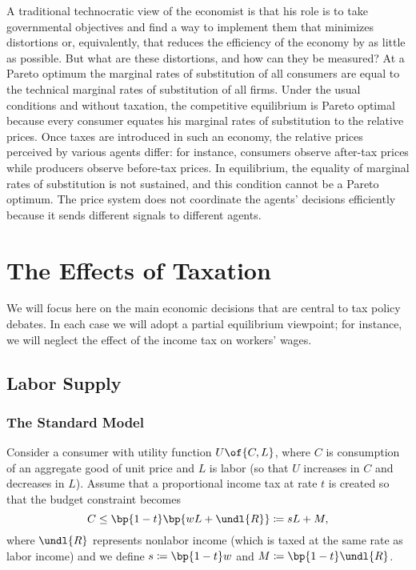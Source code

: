 \documentclass[12pt]{report}
\theoremstyle{definition}
\begin{document}
A traditional technocratic view of the economist is that his role is to take governmental objectives and find a way to implement them that minimizes distortions or, equivalently, that reduces the efficiency of the economy by as little as possible. But what are these distortions, and how can they be measured? At a Pareto optimum the marginal rates of substitution of all consumers are equal to the technical marginal rates of substitution of all firms. Under the usual conditions and without taxation, the competitive equilibrium is Pareto optimal because every consumer equates his marginal rates of substitution to the relative prices. Once taxes are introduced in such an economy, the relative prices perceived by various agents differ: for instance, consumers observe after-tax prices while producers observe before-tax prices. In equilibrium, the equality of marginal rates of substitution is not sustained, and this condition cannot be a Pareto optimum. The price system does not coordinate the agents' decisions efficiently because it sends different signals to different agents.

\section{The Effects of Taxation}

We will focus here on the main economic decisions that are central to tax policy debates. In each case we will adopt a partial equilibrium viewpoint; for instance, we will neglect the effect of the income tax on workers' wages.

\subsection{Labor Supply}

\subsubsection{The Standard Model}

Consider a consumer with utility function $U\of{C, L}$, where $C$ is consumption of an aggregate good of unit price and $L$ is labor (so that $U$ increases in $C$ and decreases in $L$). Assume that a proportional income tax at rate $t$ is created so that the budget constraint becomes 
\begin{equation}
    \notag 
    C \leq \bp{1-t} \bp{w L + \undl{R}} \coloneqq s L + M,
\end{equation}
where $\undl{R}$ represents nonlabor income (which is taxed at the same rate as labor income) and we define $s \coloneqq \bp{1-t}w$ and $M \coloneqq \bp{1-t} \undl{R}$.
\end{document}
